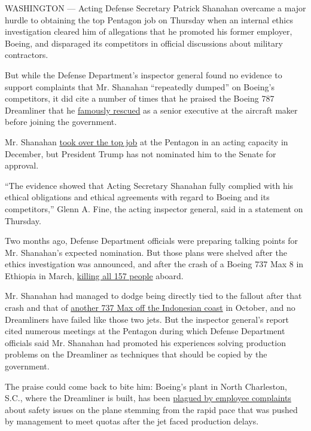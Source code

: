 WASHINGTON --- Acting Defense Secretary Patrick Shanahan overcame a
major hurdle to obtaining the top Pentagon job on Thursday when an
internal ethics investigation cleared him of allegations that he
promoted his former employer, Boeing, and disparaged its competitors in
official discussions about military contractors.

But while the Defense Department's inspector general found no evidence
to support complaints that Mr. Shanahan ``repeatedly dumped'' on
Boeing's competitors, it did cite a number of times that he praised the
Boeing 787 Dreamliner that he
\href{https://www.nytimes.com/2017/04/01/business/patrick-shanahan-pentagon-nominee.html}{famously
rescued} as a senior executive at the aircraft maker before joining the
government.

Mr. Shanahan
\href{https://www.nytimes.com/2018/12/23/us/politics/trump-mattis.html}{took
over the top job} at the Pentagon in an acting capacity in December, but
President Trump has not nominated him to the Senate for approval.

``The evidence showed that Acting Secretary Shanahan fully complied with
his ethical obligations and ethical agreements with regard to Boeing and
its competitors,'' Glenn A. Fine, the acting inspector general, said in
a statement on Thursday.

Two months ago, Defense Department officials were preparing talking
points for Mr. Shanahan's expected nomination. But those plans were
shelved after the ethics investigation was announced, and after the
crash of a Boeing 737 Max 8 in Ethiopia in March,
\href{https://www.nytimes.com/2019/04/04/world/asia/ethiopia-crash-boeing.html?module=inline}{killing
all 157 people} aboard.

Mr. Shanahan had managed to dodge being directly tied to the fallout
after that crash and that of
\href{https://www.nytimes.com/2019/02/03/world/asia/lion-air-plane-crash-pilots.html}{another
737 Max off the Indonesian coast} in October, and no Dreamliners have
failed like those two jets. But the inspector general's report cited
numerous meetings at the Pentagon during which Defense Department
officials said Mr. Shanahan had promoted his experiences solving
production problems on the Dreamliner as techniques that should be
copied by the government.

The praise could come back to bite him: Boeing's plant in North
Charleston, S.C., where the Dreamliner is built, has been
\href{https://www.nytimes.com/2019/04/20/business/boeing-dreamliner-production-problems.html}{plagued
by employee complaints} about safety issues on the plane stemming from
the rapid pace that was pushed by management to meet quotas after the
jet faced production delays.

